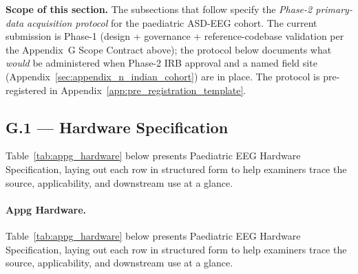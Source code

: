 \noindent\textbf{Scope of this section.} The subsections that follow specify the \emph{Phase-2 primary-data acquisition protocol} for the paediatric ASD-EEG cohort. The current submission is Phase-1 (design + governance + reference-codebase validation per the Appendix~G Scope Contract above); the protocol below documents what \emph{would} be administered when Phase-2 IRB approval and a named field site (Appendix~\ref{sec:appendix_n_indian_cohort}) are in place. The protocol is pre-registered in Appendix~\ref{app:pre_registration_template}.

\subsection*{G.1 --- Hardware Specification}
\label{subsec:appg_hardware}


{\tablestripes\tablefontsize

\noindent Table~\ref{tab:appg_hardware} below presents Paediatric EEG Hardware Specification, laying out each row in structured form to help examiners trace the source, applicability, and downstream use at a glance. %
\paragraph{Appg Hardware.} %
\noindent Table~\ref{tab:appg_hardware} below presents Paediatric EEG Hardware Specification, laying out each row in structured form to help examiners trace the source, applicability, and downstream use at a glance. %



}
